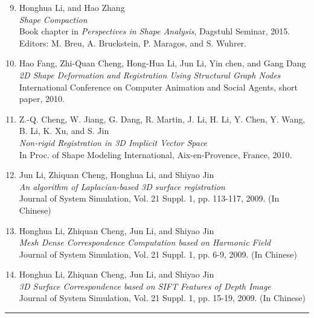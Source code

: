 \documentclass[10pt]{article}
\newcommand{\myRule}{\textcolor{gray}{\rule[2.5mm]{18cm}{1.5pt}}}
\newcommand{\head}[1]{\vspace{5mm}{\textbf{\textit{{\Large #1}}}}{\newline}\myRule}
\begin{document}
	\begin{enumerate}\setcounter{enumi}{8}
		\item Honghua Li, and Hao Zhang \\ \textit{Shape Compaction} \\
		Book chapter in \emph{Perspectives in Shape Analysis}, Dagstuhl Seminar, 2015.\\
		Editors: M. Breu, A. Bruckstein, P. Maragos, and S. Wuhrer.
		
		\item Hao Fang, Zhi-Quan Cheng, Hong-Hua Li, Jun Li, Yin chen, and Gang Dang\\
		\textit{2D Shape Deformation and Registration Using Structural Graph Nodes} \\
		International Conference on Computer Animation and Social Agents, short paper, 2010.
		
		\item Z.-Q. Cheng, W. Jiang, G. Dang, R. Martin, J. Li, H. Li, Y. Chen, Y. Wang, B. Li, K. Xu, and S. Jin\\
		\textit{Non-rigid Registration in 3D Implicit Vector Space}\\
		In Proc. of Shape Modeling International, Aix-en-Provence, France, 2010.
		
		\item Jun Li, Zhiquan Cheng, Honghua Li, and Shiyao Jin\\
		\textit{An algorithm of Laplacian-based 3D surface registration}\\
		Journal of System Simulation, Vol. 21 Suppl. 1, pp. 113-117, 2009. (In Chinese)
		
		\item Honghua Li, Zhiquan Cheng, Jun Li, and Shiyao Jin\\
		\textit{Mesh Dense Correspondence Computation based on Harmonic Field}\\
		Journal of System Simulation, Vol. 21 Suppl. 1, pp. 6-9, 2009. (In Chinese)
		
		\item Honghua Li, Zhiquan Cheng, Jun Li, and Shiyao Jin\\
		\textit{3D Surface Correspondence based on SIFT	Features of Depth Image}\\
		Journal of System Simulation, Vol. 21 Suppl. 1, pp. 15-19, 2009. (In Chinese)
	\end{enumerate}



\head{Work Experience}
\end{document}
